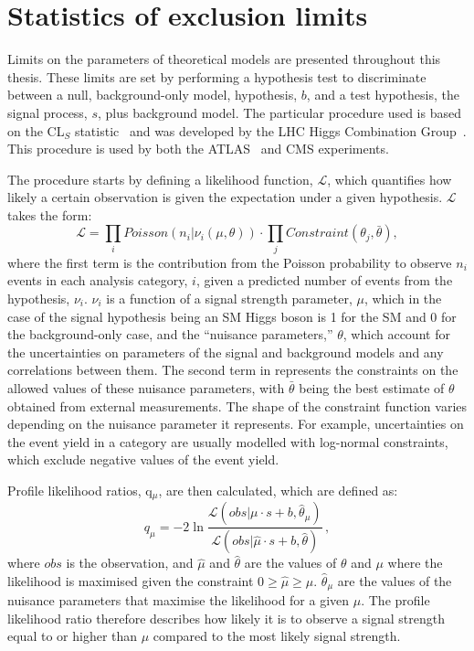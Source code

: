 \section{Statistics of exclusion limits}
\label{sec:stats}
Limits on the parameters of theoretical models are presented throughout this thesis. These limits are set by performing a hypothesis test to discriminate between a null, background-only model, hypothesis, $b$, and a test hypothesis, the signal process, $s$, plus background model. The particular procedure used is based on the CL$_{S}$ statistic~\cite{Read:2002hq} and was developed by the LHC Higgs Combination Group~\cite{ATL-PHYS-PUB-2011-011}.  This procedure is used by both the ATLAS~\cite{Aad:1129811} and CMS experiments.

The procedure starts by defining a likelihood function, $\mathcal{L}$, which quantifies how likely a certain observation is given the expectation under a given hypothesis. $\mathcal{L}$ takes the form:
\begin{equation}
  \label{eq:likelihood}
  \mathcal{L}=\displaystyle\prod_{i}Poisson\left(n_{i}|\nu_{i}\left(\mu,\theta\right)\right)\cdot\prod_{j}Constraint\left(\theta_{j},\bar{\theta}\right),
\end{equation}
where the first term is the contribution from the Poisson probability to observe $n_{i}$ events in each analysis category, $i$, given a predicted number of events from the hypothesis, $\nu_{i}$. $\nu_{i}$ is a function of a signal strength parameter, $\mu$, which in the case of the signal hypothesis being an SM Higgs boson is 1 for the SM and 0 for the background-only case, and the ``nuisance parameters,'' $\theta$, which account for the uncertainties on parameters of the signal and background models and any correlations between them. The second term in  represents the constraints on the allowed values of these nuisance parameters, with $\bar{\theta}$ being the best estimate of $\theta$ obtained from external measurements. The shape of the constraint function varies depending on the nuisance parameter it represents. For example, uncertainties on the event yield in a category are usually modelled with log-normal constraints, which exclude negative values of the event yield. 

Profile likelihood ratios, q$_{\mu}$, are then calculated, which are defined as:
\begin{equation}
  \label{eq:proflikelihood}
  q_{\mu} = -2 \ln\frac{\mathcal{L}(obs|\mu \cdot s + b,\hat{\theta}_{\mu})}{\mathcal{L}(obs|\hat{\mu} \cdot s + b,\hat{\theta})}\,,
\end{equation}
where $obs$ is the observation, and $\hat{\mu}$ and $\hat{\theta}$ are the values of $\theta$ and $\mu$ where the likelihood is maximised given the constraint $0 \geqslant \hat{\mu} \geqslant \mu$. $\hat{\theta}_{\mu}$ are the values of the nuisance parameters that maximise the likelihood for a given $\mu$. The profile likelihood ratio therefore describes how likely it is to observe a signal strength equal to or higher than $\mu$ compared to the most likely signal strength.

